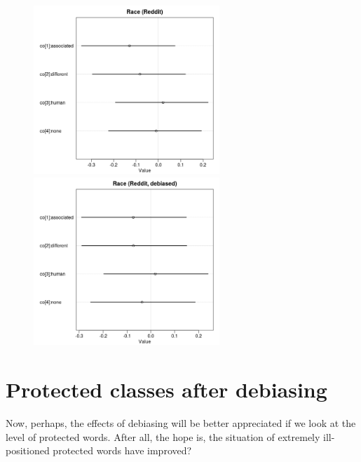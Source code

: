 \documentclass[12pt,]{book}
\begin{document}
\begin{center}
\begin{figure}[!htb]
   
  \begin{minipage}{0.55\textwidth}
\includegraphics[width=7cm]{../images/raceCoeffs.jpeg}
\end{minipage}
   \begin {minipage}{0.43\textwidth}
    \includegraphics[width=7cm]{../images/debiasedRaceRedditCoeffs.jpeg}
   \end{minipage}
\end{figure}

\end{center}

\section{Protected classes after
debiasing}\label{protected-classes-after-debiasing}

Now, perhaps, the effects of debiasing will be better appreciated if we
look at the level of protected words. After all, the hope is, the
situation of extremely ill-positioned protected words have improved?
\end{document}
